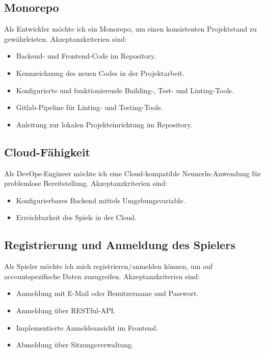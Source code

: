 \documentclass[letterpaper, 10 pt, conference]{IEEEtran}
\begin{document}
\subsection{Monorepo}

Als Entwickler möchte ich ein Monorepo, um einen konsistenten Projektstand zu gewährleisten. Akzeptanzkriterien sind:

\begin{itemize}

   \item Backend- und Frontend-Code im Repository.
   \item Kennzeichnung des neuen Codes in der Projektarbeit.
   \item Konfigurierte und funktionierende Building-, Test- und Linting-Tools.
   \item Gitlab-Pipeline für Linting- und Testing-Tools.
   \item Anleitung zur lokalen Projekteinrichtung im Repository.
   
\end{itemize}


\subsection{Cloud-Fähigkeit}

Als DevOps-Engineer möchte ich eine Cloud-kompatible Neunerln-Anwendung für problemlose Bereitstellung. Akzeptanzkriterien sind:

\begin{itemize}

   \item Konfigurierbares Backend mittels Umgebungsvariable.
   \item Erreichbarkeit des Spiels in der Cloud.
   
\end{itemize}


\subsection{Registrierung und Anmeldung des Spielers} 

Als Spieler möchte ich mich registrieren/anmelden können, um auf accountspezifische Daten zuzugreifen. Akzeptanzkriterien sind:

\begin{itemize}

   \item Anmeldung mit E-Mail oder Benutzername und Passwort.
   \item Anmeldung über RESTful-API.
   \item Implementierte Anmeldeansicht im Frontend.
   \item Abmeldung über Sitzungsverwaltung.
   
\end{itemize}
\end{document}
